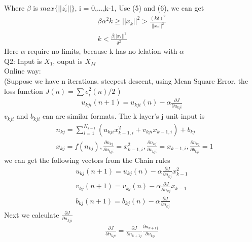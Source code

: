 \documentclass{article}
\begin{document}
Where $ \beta $ is $ max\{||z^{'}_{i}||\} $, i = 0,...,k-1, Use (5) and (6), we can get
\begin{equation*}
\begin{aligned}
\beta \alpha ^2 k \geq ||x_k||^2 > \frac{(k \delta)^2}{||x_*||^2} \\
k < \frac{\beta ||x_*||^2}{\delta ^2}
\end{aligned}
\end{equation*}
Here $\alpha$ require no limits, because k has no lelation with $\alpha$ \\



\noindent Q2: Input is $X_1$, ouput is $X_M$ \\
Online way: \\
(Suppose we have n iterations. steepest descent, using Mean Square Error, the loss function $J(n) = \sum e_i ^2 (n)/2 $ )\\
\begin{equation*}
\begin{aligned} 
u_{kji}(n+1) = u_{kji}(n) - \alpha \frac{\partial J}{\partial u_{kji}}
\end{aligned}
\end{equation*}
$v_{kji}$ and $b_{kji}$ can are similar formats. The k layer's j unit input is
\begin{equation*}
\begin{aligned} 
& n_{kj} = \sum _{i=1} ^{N_{k-1}} (u_{kji} x^2 _{k-1,i} + v_{kji} x_{k-1,i}) + b_{kj} \\
& x_{kj} = f(n_{kj}) , 
\frac{\partial n_{kj}}{\partial u_{kji}} = x^2 _{k-1,i} ,
\frac{\partial n_{kj}}{\partial v_{kji}} = x _{k-1,i} , 
\frac{\partial n_{kj}}{\partial b_{kji}} = 1 
\end{aligned}
\end{equation*}
we can get the following vectors from the Chain rules
\begin{equation*}
\begin{aligned} 
u_{kj}(n+1) = u_{kj}(n) - \alpha \frac{\partial J}{\partial n_{kj}} x^2 _{k-1} \\
v_{kj}(n+1) = v_{kj}(n) - \alpha \frac{\partial J}{\partial n_{kj}} x _{k-1} \\
b_{kj}(n+1) = b_{kj}(n) - \alpha \frac{\partial J}{\partial n_{kj}} 
\end{aligned}
\end{equation*}
Next we calculate $\frac{\partial J}{\partial n_{kji}} $
\begin{equation*}
\begin{aligned} 
\frac{\partial J}{\partial n_{kji}} = \frac{\partial J}{\partial n_{k+1j}}  \frac{\partial n_{k+1j}}{\partial n_{kji}} 
\end{aligned}
\end{equation*}
\end{document}
